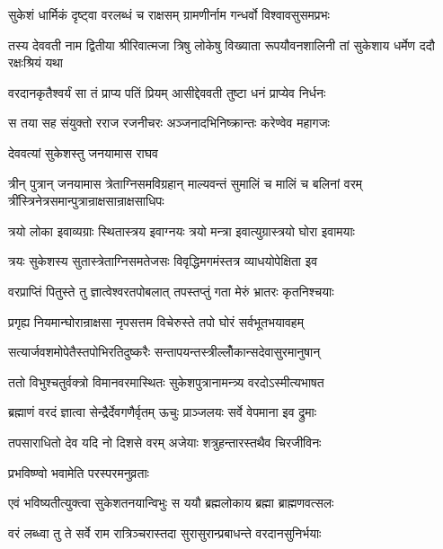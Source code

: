 
\twolineshloka
{सुकेशं धार्मिकं दृष्ट्वा वरलब्धं च राक्षसम्}
{ग्रामणीर्नाम गन्धर्वो विश्वावसुसमप्रभः} %

\threelineshloka
{तस्य देववती नाम द्वितीया श्रीरिवात्मजा}
{त्रिषु लोकेषु विख्याता रूपयौवनशालिनी}
{तां सुकेशाय धर्मेण ददौ रक्षःश्रियं यथा} %

\twolineshloka
{वरदानकृतैश्वर्यं सा तं प्राप्य पतिं प्रियम्}
{आसीद्देववती तुष्टा धनं प्राप्येव निर्धनः} %

\twolineshloka
{स तया सह संयुक्तो रराज रजनीचरः}
{अञ्जनादभिनिष्क्रान्तः करेण्वेव महागजः} %

\onelineshloka
{देववत्यां सुकेशस्तु जनयामास राघव} %

\threelineshloka
{त्रीन् पुत्रान् जनयामास त्रेताग्निसमविग्रहान्}
{माल्यवन्तं सुमालिं च मालिं च बलिनां वरम्}
{त्रींस्त्रिनेत्रसमान्पुत्रान्राक्षसान्राक्षसाधिपः} %

\twolineshloka
{त्रयो लोका इवाव्यग्राः स्थितास्त्रय इवाग्नयः}
{त्रयो मन्त्रा इवात्युग्रास्त्रयो घोरा इवामयाः} %

\twolineshloka
{त्रयः सुकेशस्य सुतास्त्रेताग्निसमतेजसः}
{विवृद्धिमगमंस्तत्र व्याधयोपेक्षिता इव} %

\twolineshloka
{वरप्राप्तिं पितुस्ते तु ज्ञात्वेश्वरतपोबलात्}
{तपस्तप्तुं गता मेरुं भ्रातरः कृतनिश्चयाः} %

\twolineshloka
{प्रगृह्य नियमान्घोरान्राक्षसा नृपसत्तम}
{विचेरुस्ते तपो घोरं सर्वभूतभयावहम्} %

\twolineshloka
{सत्यार्जवशमोपेतैस्तपोभिरतिदुष्करैः}
{सन्तापयन्तस्त्रील्लोँकान्सदेवासुरमानुषान्} %

\twolineshloka
{ततो विभुश्चतुर्वक्त्रो विमानवरमास्थितः}
{सुकेशपुत्रानामन्त्र्य वरदोऽस्मीत्यभाषत} %

\twolineshloka
{ब्रह्माणं वरदं ज्ञात्वा सेन्द्रैर्देवगणैर्वृतम्}
{ऊचुः प्राञ्जलयः सर्वे वेपमाना इव द्रुमाः} %

\twolineshloka
{तपसाराधितो देव यदि नो दिशसे वरम्}
{अजेयाः शत्रुहन्तारस्तथैव चिरजीविनः} %

\onelineshloka
{प्रभविष्ण्वो भवामेति परस्परमनुव्रताः} %

\twolineshloka
{एवं भविष्यतीत्युक्त्वा सुकेशतनयान्विभुः}
{स ययौ ब्रह्मलोकाय ब्रह्मा ब्राह्मणवत्सलः} %

\twolineshloka
{वरं लब्ध्वा तु ते सर्वे राम रात्रिञ्चरास्तदा}
{सुरासुरान्प्रबाधन्ते वरदानसुनिर्भयाः} %

